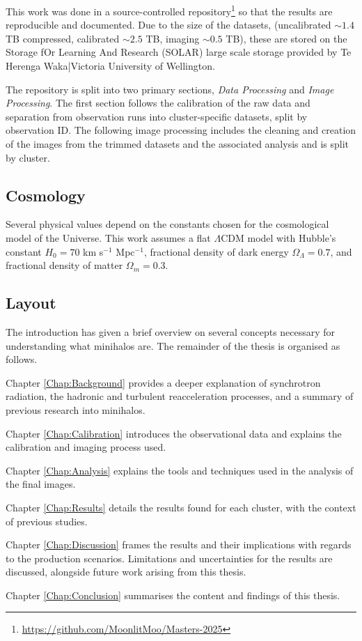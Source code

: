 This work was done in a source-controlled repository\footnote{\url{https://github.com/MoonlitMoo/Masters-2025}} so that the results are reproducible and documented. Due to the size of the datasets, (uncalibrated $\sim1.4$ TB compressed, calibrated $\sim2.5$ TB, imaging $\sim0.5$ TB), these are stored on the Storage fOr Learning And Research (SOLAR) large scale storage provided by Te Herenga Waka|Victoria University of Wellington. 

The repository is split into two primary sections, \textit{Data Processing} and \textit{Image Processing}. The first section follows the calibration of the raw data and separation from observation runs into cluster-specific datasets, split by observation ID. The following image processing includes the cleaning and creation of the images from the trimmed datasets and the associated analysis and is split by cluster.

\subsection{Cosmology}
Several physical values depend on the constants chosen for the cosmological model of the Universe. This work assumes a flat $\Lambda$CDM model with Hubble's constant $H_0=70$ km s$^{-1}$ Mpc$^{-1}$, fractional density of dark energy $\Omega_\Lambda=0.7$, and fractional density of matter $\Omega_m=0.3$.

\subsection{Layout}
The introduction has given a brief overview on several concepts necessary for understanding what minihalos are. The remainder of the thesis is organised as follows.

Chapter \ref{Chap:Background} provides a deeper explanation of synchrotron radiation, the hadronic and turbulent reacceleration processes, and a summary of previous research into minihalos.

Chapter \ref{Chap:Calibration} introduces the observational data and explains the calibration and imaging process used.

Chapter \ref{Chap:Analysis} explains the tools and techniques used in the analysis of the final images.

Chapter \ref{Chap:Results} details the results found for each cluster, with the context of previous studies.

Chapter \ref{Chap:Discussion} frames the results and their implications with regards to the production scenarios. Limitations and uncertainties for the results are discussed, alongside future work arising from this thesis. 

Chapter \ref{Chap:Conclusion} summarises the content and findings of this thesis.

